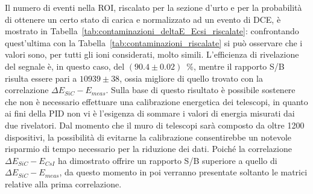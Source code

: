 Il numero di eventi nella ROI, riscalato per la sezione d'urto e per la probabilità di ottenere un certo stato di carica e normalizzato ad un evento di DCE, è mostrato in Tabella~\ref{tab:contaminazioni_deltaE_Ecsi_riscalate}: confrontando quest'ultima con la Tabella~\ref{tab:contaminazioni_riscalate} si può osservare che i valori sono, per tutti gli ioni considerati, molto simili.
L'efficienza di rivelazione del segnale è, in questo caso, del $(90.4 \pm 0.02)$~\%, mentre il rapporto S/B risulta essere pari a $10939 \pm 38 $, ossia migliore di quello trovato con la correlazione $\Delta E_{SiC} - E_{meas}$.
Sulla base di questo risultato è possibile sostenere che non è necessario effettuare una calibrazione energetica dei telescopi, in quanto ai fini della PID non vi è l'esigenza di sommare i valori di energia misurati dai due rivelatori.
Dal momento che il muro di telescopi sarà composto da oltre 1200 dispositivi, la possibilità di evitarne la calibrazione consentirebbe un notevole risparmio di tempo necessario per la riduzione dei dati.
Poiché la correlazione $\Delta E_{SiC} - E_{CsI}$ ha dimostrato offrire un rapporto S/B superiore a quello di $\Delta E_{SiC} - E_{meas}$, da questo momento in poi verranno presentate soltanto le matrici relative alla prima correlazione.









